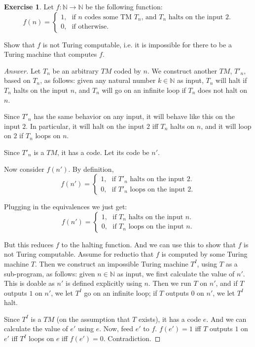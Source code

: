 \documentclass[11pt]{article}
\theoremstyle{definition}
\newtheorem{exer}{Exercise}
\begin{document}
\begin{exer}
Let $f: \mathbb{N} \rightarrow \mathbb{N}$ be the following function:
$$
f(n) = 
\begin{cases}
1, \, \, \, \, \text{if $n$ codes some TM $T_n$, and $T_n$ halts on the input $2$.} \\
0, \, \, \, \, \text{if otherwise.}
\end{cases}
$$

Show that $f$ is not Turing computable, i.e. it is impossible for there to be a Turing machine that computes $f$. 
\end{exer}

\begin{proof}[Answer]
Let $T_n$ be an arbitrary $TM$ coded by $n$. We construct another $TM$, $T'_n$, based on $T_n$, as follows: given any natural number $k \in \mathbb{N}$ as input, $T_n$ will halt if $T_n$ halts on the input $n$, and $T_n$ will go on an infinite loop if $T_n$ does not halt on $n$.

Since $T'_n$ has the same behavior on any input, it will behave like this on the input $2$. In particular, it will halt on the input $2$ iff $T_n$ halts on $n$, and it will loop on $2$ if $T_n$ loops on $n$. 

Since $T'_n$ is a $TM$, it has a code. Let its code be $n'$.

Now consider $f(n')$. By definition, 
$$
f(n') = 
\begin{cases}
1, \, \, \, \, \text{if $T'_n$ halts on the input $2$.} \\
0, \, \, \, \, \text{if $T'_n$ loops on the input $2$.}
\end{cases}
$$

Plugging in the equivalences we just get:
$$
f(n') = 
\begin{cases}
1, \, \, \, \, \text{if $T_n$ halts on the input $n$.} \\
0, \, \, \, \, \text{if $T_n$ loops on the input $n$.}
\end{cases}
$$

But this reduces $f$ to the halting function. And we can use this to show that $f$ is not Turing computable. Assume for reductio that $f$ is computed by some Turing machine $T$. Then we construct an impossible Turing machine $T^I$, using $T$ as a sub-program, as follows: given $n \in \mathbb{N}$ as input, we first calculate the value of $n'$. This is doable as $n'$ is defined explicitly using $n$. Then we run $T$ on $n'$, and if $T$ outputs $1$ on $n'$, we let $T^I$ go on an infinite loop; if $T$ outputs $0$ on $n'$, we let $T^I$ halt.

Since $T^I$ is a $TM$ (on the assumption that $T$ exists), it has a code $e$. And we can calculate the value of $e'$ using $e$. Now, feed $e'$ to $f$. $f(e') = 1$ iff $T$ outputs $1$ on $e'$ iff $T^I$ loops on $e$ iff $f(e') = 0$. Contradiction. 

\end{proof}
\end{document}
